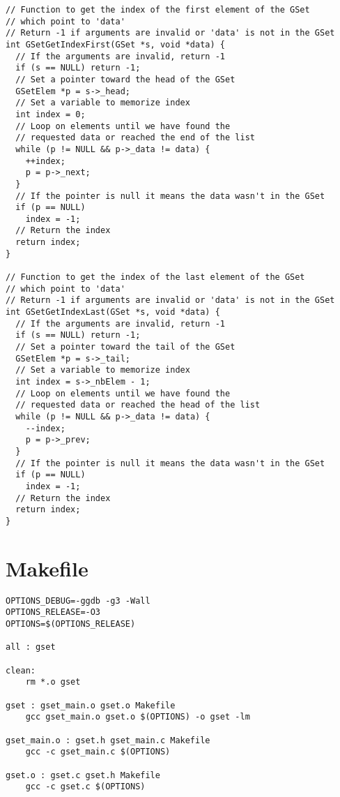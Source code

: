 \documentclass[12pt, a4paper]{article}
\begin{document}
\begin{scriptsize}
\begin{ttfamily}
\begin{lstlisting}
// Function to get the index of the first element of the GSet
// which point to 'data'
// Return -1 if arguments are invalid or 'data' is not in the GSet
int GSetGetIndexFirst(GSet *s, void *data) {
  // If the arguments are invalid, return -1
  if (s == NULL) return -1;
  // Set a pointer toward the head of the GSet
  GSetElem *p = s->_head;
  // Set a variable to memorize index
  int index = 0;
  // Loop on elements until we have found the 
  // requested data or reached the end of the list
  while (p != NULL && p->_data != data) {
    ++index;
    p = p->_next;
  }
  // If the pointer is null it means the data wasn't in the GSet
  if (p == NULL)
    index = -1;
  // Return the index
  return index;
}

// Function to get the index of the last element of the GSet
// which point to 'data'
// Return -1 if arguments are invalid or 'data' is not in the GSet
int GSetGetIndexLast(GSet *s, void *data) {
  // If the arguments are invalid, return -1
  if (s == NULL) return -1;
  // Set a pointer toward the tail of the GSet
  GSetElem *p = s->_tail;
  // Set a variable to memorize index
  int index = s->_nbElem - 1;
  // Loop on elements until we have found the 
  // requested data or reached the head of the list
  while (p != NULL && p->_data != data) {
    --index;
    p = p->_prev;
  }
  // If the pointer is null it means the data wasn't in the GSet
  if (p == NULL)
    index = -1;
  // Return the index
  return index;
}
\end{lstlisting}
\end{ttfamily}
\end{scriptsize}

\section{Makefile}

\begin{scriptsize}
\begin{ttfamily}
\begin{lstlisting}
OPTIONS_DEBUG=-ggdb -g3 -Wall
OPTIONS_RELEASE=-O3
OPTIONS=$(OPTIONS_RELEASE)

all : gset

clean:
	rm *.o gset
	
gset : gset_main.o gset.o Makefile
	gcc gset_main.o gset.o $(OPTIONS) -o gset -lm 

gset_main.o : gset.h gset_main.c Makefile
	gcc -c gset_main.c $(OPTIONS)

gset.o : gset.c gset.h Makefile
	gcc -c gset.c $(OPTIONS)

\end{lstlisting}
\end{ttfamily}
\end{scriptsize}
\end{document}
